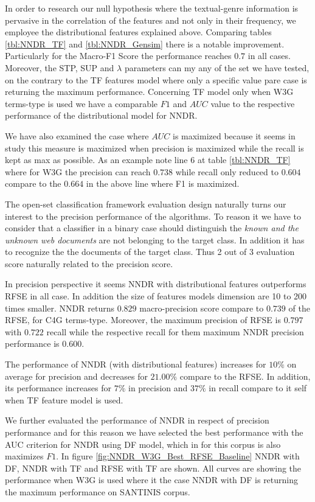In order to research our null hypothesis where the textual-genre information is pervasive in the correlation of the features and not only in their frequency, we employee the distributional features explained above. Comparing tables \ref{tbl:NNDR_TF} and \ref{tbl:NNDR_Gensim} there is a notable improvement. Particularly for the Macro-F1 Score the performance reaches $0.7$ in all cases. Moreover, the STP, SUP and $\lambda$ parameters can my any of the set we have tested, on the contrary to the TF features model where only a specific value pare case is returning the maximum performance. Concerning TF model only when W3G terms-type is used we have a comparable $F1$ and $AUC$ value to the respective performance of the distributional model for NNDR.

We have also examined the case where $AUC$ is maximized because it seems in \cite{pritsos2018open} study this measure is maximized when precision is maximized while the recall is kept as max as possible. As an example note line 6 at table \ref{tbl:NNDR_TF} where for W3G the precision can reach $0.738$ while recall only reduced to $0.604$ compare to the $0.664$ in the above line where F1 is maximized.

The open-set classification framework evaluation design naturally turns our interest to the precision performance of the algorithms. To reason it we have to consider that a classifier in a binary case should distinguish the \textit{known and the unknown web documents} are not belonging to the target class. In addition it has to recognize the the documents of the target class. Thus 2 out of 3 evaluation score naturally related to the precision score.

In precision perspective it seems NNDR with distributional features outperforms RFSE in all case. In addition the size of features models dimension are 10 to 200 times smaller. NNDR returns $0.829$ macro-precision score compare to $0.739$ of the RFSE, for C4G terms-type. Moreover, the maximum precision of RFSE is $0.797$ with $0.722$ recall while the respective recall for them maximum NNDR precision performance is $0.600$.

The performance of NNDR (with distributional features) increases for $10\%$ on average for precision and decreases for $21.00\%$ compare to the RFSE. In addition, its performance increases for $7\%$ in precision and $37\%$ in recall compare to it self when TF feature model is used.

We further evaluated the performance of NNDR in respect of precision performance and for this reason we have selected the best performance with the AUC criterion for NNDR using DF model, which in for this corpus is also maximizes $F1$. In figure \ref{fig:NNDR_W3G_Best_RFSE_Baseline} NNDR with DF, NNDR with TF and RFSE with TF are shown. All curves are showing the performance when W3G is used where it the case NNDR with DF is returning the maximum performance on SANTINIS corpus.


